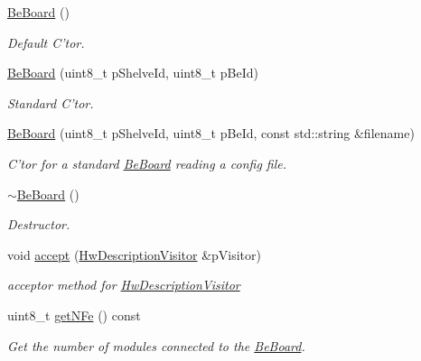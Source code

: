 \begin{CompactItemize}
\item 
\hyperlink{class_ph2___hw_description_1_1_be_board_3bd1302a3dbf6ff0ba59dab710cfa537}{Be\-Board} ()
\begin{CompactList}\small\item\em Default C'tor. \item\end{CompactList}\item 
\hyperlink{class_ph2___hw_description_1_1_be_board_4aca8e709e5ae58d4d12ea544dff9a9e}{Be\-Board} (uint8\_\-t p\-Shelve\-Id, uint8\_\-t p\-Be\-Id)
\begin{CompactList}\small\item\em Standard C'tor. \item\end{CompactList}\item 
\hyperlink{class_ph2___hw_description_1_1_be_board_53b49ebde44e6c052c64865b50f33764}{Be\-Board} (uint8\_\-t p\-Shelve\-Id, uint8\_\-t p\-Be\-Id, const std::string \&filename)
\begin{CompactList}\small\item\em C'tor for a standard \hyperlink{class_ph2___hw_description_1_1_be_board}{Be\-Board} reading a config file. \item\end{CompactList}\item 
\hyperlink{class_ph2___hw_description_1_1_be_board_9e763718213e7106b7a6ba1ccb5d23e2}{$\sim$Be\-Board} ()
\begin{CompactList}\small\item\em Destructor. \item\end{CompactList}\item 
void \hyperlink{class_ph2___hw_description_1_1_be_board_ccc84350bce4a95a2ce27bde0b146422}{accept} (\hyperlink{class_hw_description_visitor}{Hw\-Description\-Visitor} \&p\-Visitor)
\begin{CompactList}\small\item\em acceptor method for \hyperlink{class_hw_description_visitor}{Hw\-Description\-Visitor} \item\end{CompactList}\item 
uint8\_\-t \hyperlink{class_ph2___hw_description_1_1_be_board_34239d72c4929ae85cd9eb27a6bf9b2d}{get\-NFe} () const 
\begin{CompactList}\small\item\em Get the number of modules connected to the \hyperlink{class_ph2___hw_description_1_1_be_board}{Be\-Board}. \item\end{CompactList}\item 

\end{CompactItemize}
